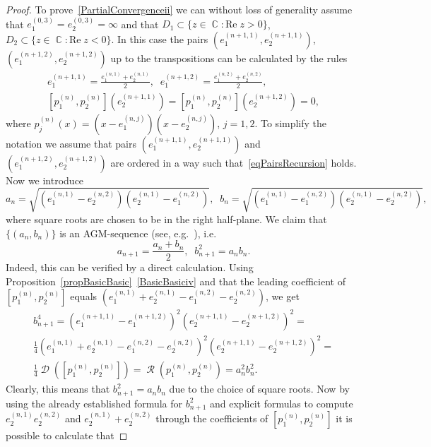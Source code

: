 \documentclass{amsart}
\numberwithin{equation}{section}
\theoremstyle{definition}
\theoremstyle{remark}
\DeclareMathOperator{\CC}{\mathbb C}
\DeclareMathOperator{\Res}{\mathcal R}
\DeclareMathOperator{\Discr}{\mathcal D}
\begin{document}
\begin{proof}
		To prove~\ref{PartialConvergenceii} we can without loss of generality assume that $e^{(0,3)}_{1} = e^{(0,3)}_{2} = \infty$ and that $D_1 \subset \{z \in \CC: \mathrm{Re}\; z > 0\}$, $ D_2 \subset \{z \in \CC: \mathrm{Re}\; z < 0\}$. In this case the pairs $\left(e_1^{(n+1,1)}, e_2^{(n+1,1)}\right)$, $\left(e_1^{(n+1,2)}, e_2^{(n+1,2)}\right)$ up to the transpositions can be calculated by the rules
		\begin{equation}\label{eqPairsRecursion}
			\begin{gathered}
				e_1^{(n+1,1)} = \frac{e_1^{(n,1)} + e_2^{(n,1)}}{2},\;\;e_1^{(n+1,2)} = \frac{e_1^{(n,2)} + e_2^{(n,2)}}{2}, \\
				\left[p_1^{(n)}, p_2^{(n)}\right]\left(e_2^{(n+1,1)}\right) = \left[p_1^{(n)}, p_2^{(n)}\right]\left(e_2^{(n+1,2)}\right) = 0,
			\end{gathered}
		\end{equation}
		where $p_j^{(n)}(x) = \left(x - e_1^{(n,j)}\right)\left(x -e_2^{(n,j)}\right)$, $j = 1,2$. To simplify the notation we assume that pairs $\left(e_1^{(n+1,1)}, e_2^{(n+1,1)}\right)$ and $\left(e_1^{(n+1,2)}, e_2^{(n+1,2)}\right)$ are ordered in a way such that~\eqref{eqPairsRecursion} holds. Now we introduce
		\[
		a_n = \sqrt{\left(e_1^{(n,1)} - e_2^{(n,2)}\right)\left(e_2^{(n,1)} - e_1^{(n,2)}\right)},\;\;b_n = \sqrt{\left(e_1^{(n,1)} - e_1^{(n,2)}\right)\left(e_2^{(n,1)} - e_2^{(n,2)}\right)},
		\]
		where square roots are chosen to be in the right half-plane. We claim that $\{(a_n,b_n)\}$ is an AGM-sequence (see, e.g.~\cite{Cremona}), i.e.
		\[
		a_{n+1} = \frac{a_n + b_n}{2},\;\;b_{n+1}^2 = a_nb_n.
		\]
		Indeed, this can be verified by a direct calculation. Using Proposition~\ref{propBasicBasic}~\ref{BasicBasiciv} and that the leading coefficient of $\left[p_1^{(n)}, p_2^{(n)}\right]$ equals $\left(e_1^{(n,1)} + e_2^{(n,1)} - e_1^{(n,2)} - e_2^{(n,2)}\right)$, we get
		\begin{multline*}
			b_{n+1}^4 = \left(e_1^{(n+1,1)} - e_1^{(n+1,2)}\right)^2\left(e_2^{(n+1,1)} - e_2^{(n+1,2)}\right)^2 = \\
			\frac{1}{4}\left(e_1^{(n,1)} + e_2^{(n,1)} - e_1^{(n,2)} - e_2^{(n,2)}\right)^2\left(e_2^{(n+1,1)} - e_2^{(n+1,2)}\right)^2 =\\ \frac{1}{4}\Discr\left(\left[p_1^{(n)}, p_2^{(n)}\right]\right) = 
			\Res\left(p_1^{(n)}, p_2^{(n)}\right) = a_n^2 b_n^2.
		\end{multline*}
		Clearly, this means that $b_{n+1}^2 = a_n b_n$ due to the choice of square roots. Now by using the already established formula for $b_{n+1}^2$ and explicit formulas to compute $e_2^{(n,1)}e_2^{(n,2)}$ and $e_2^{(n,1)}+e_2^{(n,2)}$ through the coefficients of $\left[p_1^{(n)}, p_2^{(n)}\right]$ it is possible to calculate that

\end{proof}
\end{document}
